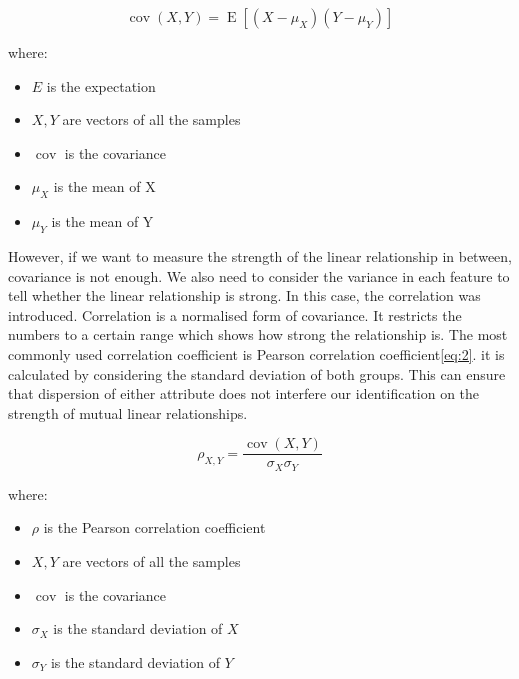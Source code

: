\documentclass[11pt]{article} %
\theoremstyle{plain}
\theoremstyle{definition}
\begin{document}
{
  \begin{equation}
    \label{eq:1}
    {\operatorname {cov} (X,Y)=\operatorname {E} [(X-\mu _{X})(Y-\mu _{Y})]}
  \end{equation}

  \footnotesize
  where:
  \begin{itemize}[label=-, leftmargin=4em, itemsep=0.1em]
    \item ${E}$ is the expectation
    \item ${X, Y}$ are vectors of all the samples
    \item $\operatorname {cov}$ is the covariance
    \item ${\mu}_{X}$ is the mean of X
    \item ${\mu}_{Y}$ is the mean of Y
  \end{itemize}
}

However, if we want to measure the strength of the linear relationship in between, covariance is not enough. We also need to consider the variance in each feature to tell whether the linear relationship is strong. In this case, the correlation was introduced. Correlation is a normalised form of covariance. It restricts the numbers to a certain range which shows how strong the relationship is. The most commonly used correlation coefficient is Pearson correlation coefficient\eqref{eq:2}. it is calculated by considering the standard deviation of both groups. This can ensure that dispersion of either attribute does not interfere our identification on the strength of mutual linear relationships\cite{wiki/pcc:2018}.

{
  \begin{equation}
    \label{eq:2}
    \rho _{X,Y}={\frac {\operatorname {cov} (X,Y)}{\sigma _{X}\sigma _{Y}}}
  \end{equation}

  \footnotesize
  where:
  \begin{itemize}[label=-, leftmargin=4em, itemsep=0.1em]
    \item ${\rho}$ is the Pearson correlation coefficient
    \item ${X, Y}$ are vectors of all the samples
    \item $\operatorname {cov}$ is the covariance
    \item ${\sigma}_{X}$ is the standard deviation of ${X}$
    \item ${\sigma}_{Y}$ is the standard deviation of ${Y}$
  \end{itemize}
}
\end{document}
